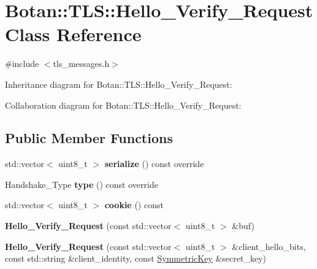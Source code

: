 \hypertarget{class_botan_1_1_t_l_s_1_1_hello___verify___request}{}\section{Botan\+:\+:T\+LS\+:\+:Hello\+\_\+\+Verify\+\_\+\+Request Class Reference}
\label{class_botan_1_1_t_l_s_1_1_hello___verify___request}


{\ttfamily \#include $<$tls\+\_\+messages.\+h$>$}



Inheritance diagram for Botan\+:\+:T\+LS\+:\+:Hello\+\_\+\+Verify\+\_\+\+Request\+:


Collaboration diagram for Botan\+:\+:T\+LS\+:\+:Hello\+\_\+\+Verify\+\_\+\+Request\+:
\subsection*{Public Member Functions}
\begin{DoxyCompactItemize}
\item 
\mbox{\label{class_botan_1_1_t_l_s_1_1_hello___verify___request_ac92a6cadc8ff89b75262e4123aca9bc3}} 
std\+::vector$<$ uint8\+\_\+t $>$ {\bfseries serialize} () const override
\item 
\mbox{\label{class_botan_1_1_t_l_s_1_1_hello___verify___request_a57ebc435e1b6d9bacf358bb31d9ba051}} 
Handshake\+\_\+\+Type {\bfseries type} () const override
\item 
\mbox{\label{class_botan_1_1_t_l_s_1_1_hello___verify___request_a6caec5aa8a4aef5a8540a8918b444457}} 
std\+::vector$<$ uint8\+\_\+t $>$ {\bfseries cookie} () const
\item 
\mbox{\label{class_botan_1_1_t_l_s_1_1_hello___verify___request_a6804bcf547fd9de1a96f4dabbddccfde}} 
{\bfseries Hello\+\_\+\+Verify\+\_\+\+Request} (const std\+::vector$<$ uint8\+\_\+t $>$ \&buf)
\item 
\mbox{\label{class_botan_1_1_t_l_s_1_1_hello___verify___request_ae8feacf514c52b5868ef0696e03fb70a}} 
{\bfseries Hello\+\_\+\+Verify\+\_\+\+Request} (const std\+::vector$<$ uint8\+\_\+t $>$ \&client\+\_\+hello\+\_\+bits, const std\+::string \&client\+\_\+identity, const \mbox{\hyperlink{namespace_botan_a89cf6c3513428f524454d01830221a88}{Symmetric\+Key}} \&secret\+\_\+key)
\end{DoxyCompactItemize}


